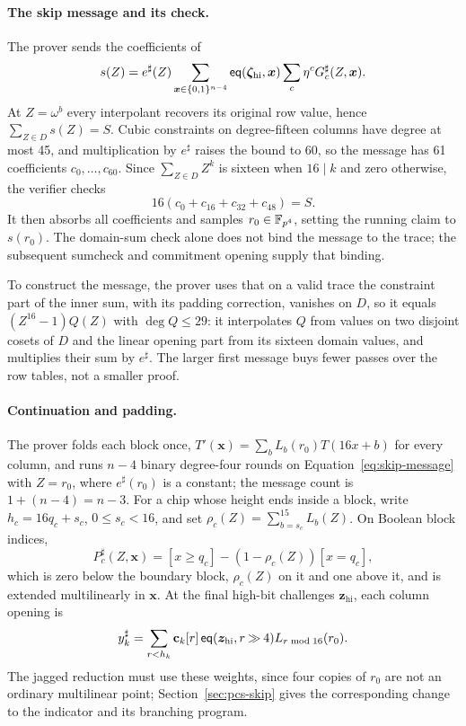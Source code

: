 \paragraph{The skip message and its check.}
The prover sends the coefficients of
\begin{equation}
\label{eq:skip-message}
  s(Z)=e^\sharp(Z)
    \sum_{\bm x\in\{0,1\}^{n-4}}
      \mathsf{eq}(\bm\zeta_{\mathrm{hi}},\bm x)
      \sum_c\eta^cG_c^\sharp(Z,\bm x).
\end{equation}
At $Z=\omega^b$ every interpolant recovers its original row value, hence $\sum_{Z\in D}s(Z)=S$. Cubic constraints on degree-fifteen columns have degree at most 45, and multiplication by $e^\sharp$ raises the bound to 60, so the message has 61 coefficients $c_0,\ldots,c_{60}$. Since $\sum_{Z\in D}Z^k$ is sixteen when $16\mid k$ and zero otherwise, the verifier checks
\begin{equation}
\label{eq:skip-domain-sum}
  16(c_0+c_{16}+c_{32}+c_{48})=S.
\end{equation}
It then absorbs all coefficients and samples $r_0\in\mathbb{F}_{p^4}$, setting the running claim to $s(r_0)$. The domain-sum check alone does not bind the message to the trace; the subsequent sumcheck and commitment opening supply that binding.

To construct the message, the prover uses that on a valid trace the constraint part of the inner sum, with its padding correction, vanishes on $D$, so it equals $(Z^{16}-1)Q(Z)$ with $\deg Q\le29$: it interpolates $Q$ from values on two disjoint cosets of $D$ and the linear opening part from its sixteen domain values, and multiplies their sum by $e^\sharp$. The larger first message buys fewer passes over the row tables, not a smaller proof.

\paragraph{Continuation and padding.}
The prover folds each block once, $T'(\bm x)=\sum_bL_b(r_0)T(16x+b)$ for every column, and runs $n-4$ binary degree-four rounds on Equation~\eqref{eq:skip-message} with $Z=r_0$, where $e^\sharp(r_0)$ is a constant; the message count is $1+(n-4)=n-3$. For a chip whose height ends inside a block, write $h_c=16q_c+s_c$, $0\le s_c<16$, and set $\rho_c(Z)=\sum_{b=s_c}^{15}L_b(Z)$. On Boolean block indices,
\[
  P_c^\sharp(Z,\bm x)
    =[x\ge q_c]-(1-\rho_c(Z))[x=q_c],
\]
which is zero below the boundary block, $\rho_c(Z)$ on it and one above it, and is extended multilinearly in $\bm x$. At the final high-bit challenges $\bm z_{\mathrm{hi}}$, each column opening is
\begin{equation}
\label{eq:skip-row-opening}
  y_k^\sharp=\sum_{r<h_k}\mathbf c_k[r]\,
      \mathsf{eq}(\bm z_{\mathrm{hi}},r\mathbin{\gg}4)
      L_{r\bmod16}(r_0).
\end{equation}
The jagged reduction must use these weights, since four copies of $r_0$ are not an ordinary multilinear point; Section~\ref{sec:pcs-skip} gives the corresponding change to the indicator and its branching program.

